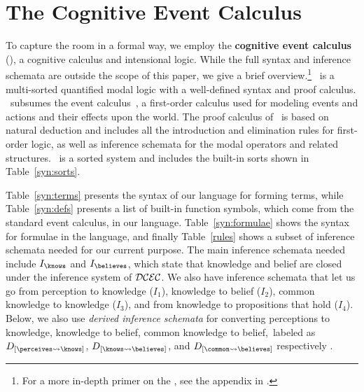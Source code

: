 \section{The Cognitive Event Calculus}

To capture the room in a formal way, we employ the
\textbf{cognitive event calculus} (\CEC), a cognitive calculus and
intensional logic.  While the full syntax
and inference schemata are outside the scope of this paper, we give a
brief overview.\footnote{For a more in-depth primer on the \DCEC, see
  the appendix in \cite{nsg_sb_dde_ijcai}.} \DCEC\ is a multi-sorted
quantified modal logic with a well-defined syntax and proof calculus.
\DCEC\ subsumes the event calculus~\cite{mueller_commonsense_2014}, a first-order
calculus used for modeling events and actions and their effects upon
the world.  The proof calculus of \DCEC\ is based on natural deduction
\cite{gentzen_investigations_1964} and includes all the introduction and elimination
rules for first-order logic, as well as inference schemata for the
modal operators and related structures.  \DCEC\ is a sorted system and
includes the built-in sorts shown in Table~\ref{syn:sorts}.

Table~\ref{syn:terms} presents the syntax of our language for forming
terms, while Table~\ref{syn:defs} presents a list of built-in function
symbols, which come from the standard event calculus, in our language.
Table~\ref{syn:formulae} shows the syntax for
formulae in the language, and finally Table~\ref{rules} shows a subset of
inference schemata needed for our current purpose. The main
inference schemata needed include $I_{\knows}$ and $I_{\believes}$,
which state that knowledge and belief are closed under the inference
system of $\mathcal{DCEC}$.  We also have inference schemata that let us go
from perception to knowledge ($I_1$), knowledge to belief ($I_2$),
common knowledge to knowledge ($I_3$), and from knowledge to
propositions that hold ($I_4$). Below, we also use \emph{derived
  inference schemata} for converting perceptions to knowledge,
knowledge to belief, common knowledge to belief,~labeled as
$D_{[\perceives \leadsto \knows]}$, $D_{[\knows \leadsto \believes]}$,
and $D_{[\common \leadsto \believes]}$ respectively
\cite{ArkoudasAndBringsjord2008Pricai}.


